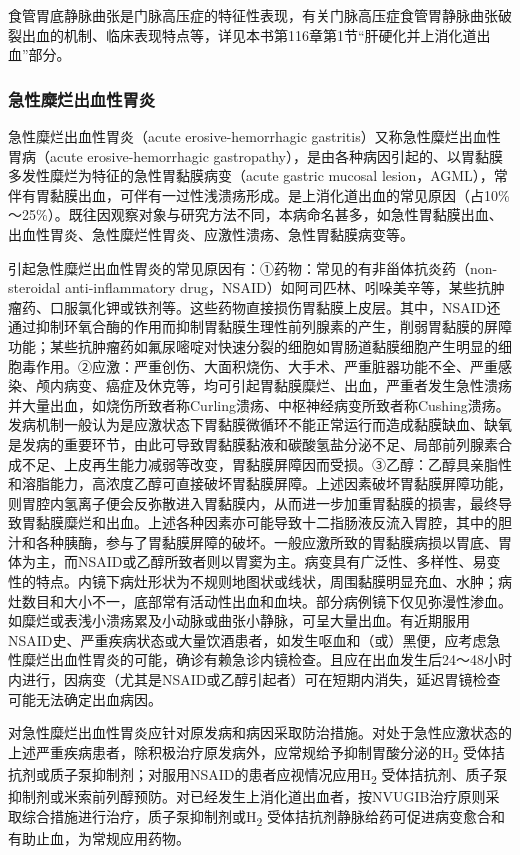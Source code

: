 食管胃底静脉曲张是门脉高压症的特征性表现，有关门脉高压症食管胃静脉曲张破裂出血的机制、临床表现特点等，详见本书第116章第1节“肝硬化并上消化道出血”部分。

\subsubsection{急性糜烂出血性胃炎}

急性糜烂出血性胃炎（acute erosive-hemorrhagic
gastritis）又称急性糜烂出血性胃病（acute erosive-hemorrhagic
gastropathy），是由各种病因引起的、以胃黏膜多发性糜烂为特征的急性胃黏膜病变（acute
gastric mucosal
lesion，AGML），常伴有胃黏膜出血，可伴有一过性浅溃疡形成。是上消化道出血的常见原因（占10\%～25\%）。既往因观察对象与研究方法不同，本病命名甚多，如急性胃黏膜出血、出血性胃炎、急性糜烂性胃炎、应激性溃疡、急性胃黏膜病变等。

引起急性糜烂出血性胃炎的常见原因有：①药物：常见的有非甾体抗炎药（non-steroidal
anti-inflammatory
drug，NSAID）如阿司匹林、吲哚美辛等，某些抗肿瘤药、口服氯化钾或铁剂等。这些药物直接损伤胃黏膜上皮层。其中，NSAID还通过抑制环氧合酶的作用而抑制胃黏膜生理性前列腺素的产生，削弱胃黏膜的屏障功能；某些抗肿瘤药如氟尿嘧啶对快速分裂的细胞如胃肠道黏膜细胞产生明显的细胞毒作用。②应激：严重创伤、大面积烧伤、大手术、严重脏器功能不全、严重感染、颅内病变、癌症及休克等，均可引起胃黏膜糜烂、出血，严重者发生急性溃疡并大量出血，如烧伤所致者称Curling溃疡、中枢神经病变所致者称Cushing溃疡。发病机制一般认为是应激状态下胃黏膜微循环不能正常运行而造成黏膜缺血、缺氧是发病的重要环节，由此可导致胃黏膜黏液和碳酸氢盐分泌不足、局部前列腺素合成不足、上皮再生能力减弱等改变，胃黏膜屏障因而受损。③乙醇：乙醇具亲脂性和溶脂能力，高浓度乙醇可直接破坏胃黏膜屏障。上述因素破坏胃黏膜屏障功能，则胃腔内氢离子便会反弥散进入胃黏膜内，从而进一步加重胃黏膜的损害，最终导致胃黏膜糜烂和出血。上述各种因素亦可能导致十二指肠液反流入胃腔，其中的胆汁和各种胰酶，参与了胃黏膜屏障的破坏。一般应激所致的胃黏膜病损以胃底、胃体为主，而NSAID或乙醇所致者则以胃窦为主。病变具有广泛性、多样性、易变性的特点。内镜下病灶形状为不规则地图状或线状，周围黏膜明显充血、水肿；病灶数目和大小不一，底部常有活动性出血和血块。部分病例镜下仅见弥漫性渗血。如糜烂或表浅小溃疡累及小动脉或曲张小静脉，可呈大量出血。有近期服用NSAID史、严重疾病状态或大量饮酒患者，如发生呕血和（或）黑便，应考虑急性糜烂出血性胃炎的可能，确诊有赖急诊内镜检查。且应在出血发生后24～48小时内进行，因病变（尤其是NSAID或乙醇引起者）可在短期内消失，延迟胃镜检查可能无法确定出血病因。

对急性糜烂出血性胃炎应针对原发病和病因采取防治措施。对处于急性应激状态的上述严重疾病患者，除积极治疗原发病外，应常规给予抑制胃酸分泌的H\textsubscript{2}
受体拮抗剂或质子泵抑制剂；对服用NSAID的患者应视情况应用H\textsubscript{2}
受体拮抗剂、质子泵抑制剂或米索前列醇预防。对已经发生上消化道出血者，按NVUGIB治疗原则采取综合措施进行治疗，质子泵抑制剂或H\textsubscript{2}
受体拮抗剂静脉给药可促进病变愈合和有助止血，为常规应用药物。


